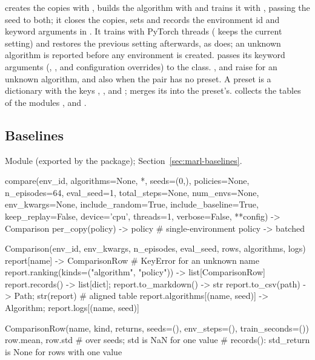  creates the copies with , builds the
algorithm with  and trains it with , passing
the seed to both; it closes the copies, sets  and records
the environment id and keyword arguments in . It trains
with  PyTorch threads ( keeps the current setting)
and restores the previous setting afterwards, as  does;
an unknown algorithm is reported before any environment is created.
 passes its keyword arguments (,
,  and configuration overrides) to the class. ,
 and  raise  for an unknown
algorithm, and  also when the pair has no preset. A preset
is a dictionary with the keys , ,
 and ;  merges its
 into the preset's.  collects the tables of the
modules ,  and
.

\subsection{Baselines}

Module  (exported by the package);
Section~\ref{sec:marl-baselines}.

\begin{pycode}
compare(env_id, algorithms=None, *, seeds=(0,), policies=None, n_episodes=64,
        eval_seed=1, total_steps=None, num_envs=None, env_kwargs=None,
        include_random=True, include_baseline=True, keep_replay=False,
        device='cpu', threads=1, verbose=False, **config) -> Comparison
per_copy(policy) -> policy          # single-environment policy -> batched

Comparison(env_id, env_kwargs, n_episodes, eval_seed, rows, algorithms, logs)
report[name] -> ComparisonRow       # KeyError for an unknown name
report.ranking(kinds=("algorithm", "policy")) -> list[ComparisonRow]
report.records() -> list[dict]; report.to_markdown() -> str
report.to_csv(path) -> Path; str(report)       # aligned table
report.algorithms[(name, seed)] -> Algorithm; report.logs[(name, seed)]

ComparisonRow(name, kind, returns, seeds=(), env_steps=(), train_seconds=())
row.mean, row.std                   # over seeds; std is NaN for one value
# records(): std_return is None for rows with one value
\end{pycode}

